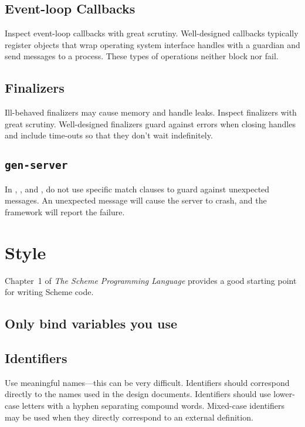 \documentclass[letterpaper,11pt,twoside,final]{article}
\begin{document}
\subsection* {Event-loop Callbacks}

Inspect event-loop callbacks with great scrutiny. Well-designed
callbacks typically register objects that wrap operating system
interface handles with a guardian and send messages to a
process. These types of operations neither block nor fail.

\subsection* {Finalizers}

Ill-behaved finalizers may cause memory and handle leaks. Inspect
finalizers with great scrutiny. Well-designed finalizers guard against
errors when closing handles and include time-outs so that they don't
wait indefinitely.

\subsection* {\texttt{gen-server}}

In , , and
, do not use specific match clauses to guard
against unexpected messages. An unexpected message will cause the
server to crash, and the framework will report the failure.

\section* {Style}

Chapter~1 of \emph{The Scheme Programming Language} provides a good
starting point for writing Scheme code.

\subsection* {Only bind variables you use}

\subsection* {Identifiers}

Use meaningful names---this can be very difficult. Identifiers should
correspond directly to the names used in the design
documents. Identifiers should use lower-case letters with a hyphen
separating compound words. Mixed-case identifiers may be used when
they directly correspond to an external definition.
\end{document}
